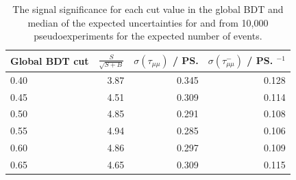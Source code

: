 {\begin{table}[htbp]
\begin{center}
\begin{tabular}{lrrr}
\toprule \toprule
Global BDT cut & $\frac{S}{\sqrt{S+B}}$&  $\sigma \left(\tau_{\mu\mu} \right)$   / \ps & $\sigma \left(\tau^{-}_{\mu\mu} \right)$ / \ps$^{-1}$ \\   
\midrule
0.40           & 3.87 & 0.345 & 0.128 \\ %
0.45        & 4.51 & 0.309 & 0.114 \\ %
0.50        & 4.85 & 0.291 & 0.108 \\ %
0.55       & 4.94 & 0.285 & 0.106 \\ %
0.60           & 4.86 & 0.297 & 0.109 \\ %
0.65            & 4.65 & 0.309 & 0.115 \\  \bottomrule \bottomrule%
\end{tabular} 
\vspace{0.7cm}
\caption{ The signal significance for each cut value in the global BDT and median of the expected uncertainties for \tmumu and \invtmumu from 10,000 pseudoexperiments for the expected number of events. }
\label{tab:selOptimisation}
\end{center}
\vspace{-1.0cm}
\end{table}

}
